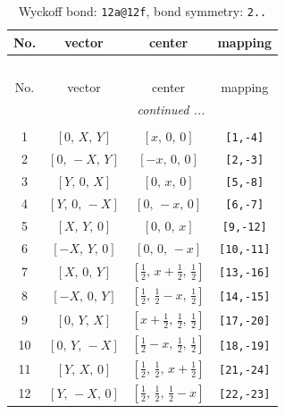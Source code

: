 \documentclass[fleqn,8pt]{jsarticle}
\begin{document}
\begin{longtable}{cccc}
\caption{Wyckoff bond: {\tt 12a@12f}, bond symmetry: {\tt 2..}}
 \\
 \hline \hline
No. & vector & center & mapping \\ \hline \endfirsthead

\multicolumn{3}{l}{\tablename\ \thetable{}} \\
 \hline \hline
No. & vector & center & mapping \\ \hline \endhead

 \hline \hline
\multicolumn{3}{r}{\footnotesize\it continued ...} \\ \endfoot

 \hline \hline
\multicolumn{3}{r}{} \\ \endlastfoot

1 & $\left[ 0,\, X,\, Y \right]$ & $\left[ x,\, 0,\, 0 \right]$ & {\tt [1,-4]} \\ \hline
2 & $\left[ 0,\, - X,\, Y \right]$ & $\left[ - x,\, 0,\, 0 \right]$ & {\tt [2,-3]} \\ \hline
3 & $\left[ Y,\, 0,\, X \right]$ & $\left[ 0,\, x,\, 0 \right]$ & {\tt [5,-8]} \\ \hline
4 & $\left[ Y,\, 0,\, - X \right]$ & $\left[ 0,\, - x,\, 0 \right]$ & {\tt [6,-7]} \\ \hline
5 & $\left[ X,\, Y,\, 0 \right]$ & $\left[ 0,\, 0,\, x \right]$ & {\tt [9,-12]} \\ \hline
6 & $\left[ - X,\, Y,\, 0 \right]$ & $\left[ 0,\, 0,\, - x \right]$ & {\tt [10,-11]} \\ \hline
7 & $\left[ X,\, 0,\, Y \right]$ & $\left[ \frac{1}{2},\, x + \frac{1}{2},\, \frac{1}{2} \right]$ & {\tt [13,-16]} \\ \hline
8 & $\left[ - X,\, 0,\, Y \right]$ & $\left[ \frac{1}{2},\, \frac{1}{2} - x,\, \frac{1}{2} \right]$ & {\tt [14,-15]} \\ \hline
9 & $\left[ 0,\, Y,\, X \right]$ & $\left[ x + \frac{1}{2},\, \frac{1}{2},\, \frac{1}{2} \right]$ & {\tt [17,-20]} \\ \hline
10 & $\left[ 0,\, Y,\, - X \right]$ & $\left[ \frac{1}{2} - x,\, \frac{1}{2},\, \frac{1}{2} \right]$ & {\tt [18,-19]} \\ \hline
11 & $\left[ Y,\, X,\, 0 \right]$ & $\left[ \frac{1}{2},\, \frac{1}{2},\, x + \frac{1}{2} \right]$ & {\tt [21,-24]} \\ \hline
12 & $\left[ Y,\, - X,\, 0 \right]$ & $\left[ \frac{1}{2},\, \frac{1}{2},\, \frac{1}{2} - x \right]$ & {\tt [22,-23]} \\
\end{longtable}
\end{document}
